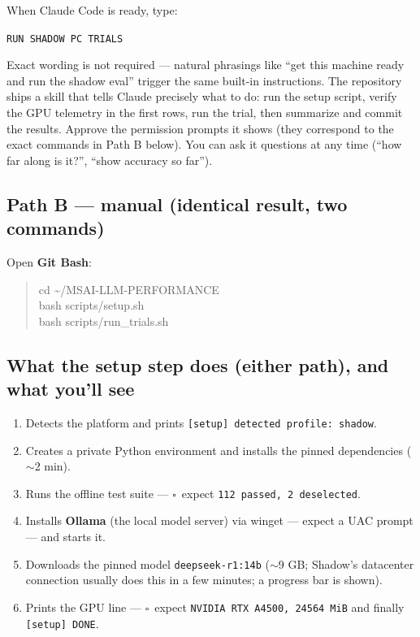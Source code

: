 \documentclass[11pt]{article}
\newenvironment{cmdblock}{\begin{quote}\small\begin{ttfamily}}{\end{ttfamily}\end{quote}}
\newcommand{\checkbox}{$\square$~}
\begin{document}
When Claude Code is ready, type:

\begin{center}
\Large\texttt{RUN SHADOW PC TRIALS}
\end{center}

Exact wording is not required --- natural phrasings like ``get this machine ready
and run the shadow eval'' trigger the same built-in instructions. The repository
ships a skill that tells Claude precisely what to do: run the setup script, verify
the GPU telemetry in the first rows, run the trial, then summarize and commit the
results. Approve the permission prompts it shows (they correspond to the exact
commands in Path B below). You can ask it questions at any time
(``how far along is it?'', ``show accuracy so far'').

\subsection*{Path B --- manual (identical result, two commands)}

Open \textbf{Git Bash}:

\begin{cmdblock}
cd \textasciitilde/MSAI-LLM-PERFORMANCE \\
bash scripts/setup.sh \\
bash scripts/run\_trials.sh
\end{cmdblock}

\subsection*{What the setup step does (either path), and what you'll see}

\begin{enumerate}
  \item Detects the platform and prints \texttt{[setup] detected profile: shadow}.
  \item Creates a private Python environment and installs the pinned dependencies
    ($\sim$2 min).
  \item Runs the offline test suite --- \checkbox expect
    \texttt{112 passed, 2 deselected}.
  \item Installs \textbf{Ollama} (the local model server) via winget --- expect a UAC
    prompt --- and starts it.
  \item Downloads the pinned model \texttt{deepseek-r1:14b} ($\sim$9 GB; Shadow's
    datacenter connection usually does this in a few minutes; a progress bar is shown).
  \item Prints the GPU line --- \checkbox expect \texttt{NVIDIA RTX A4500, 24564 MiB}
    and finally \texttt{[setup] DONE}.
\end{enumerate}
\end{document}
